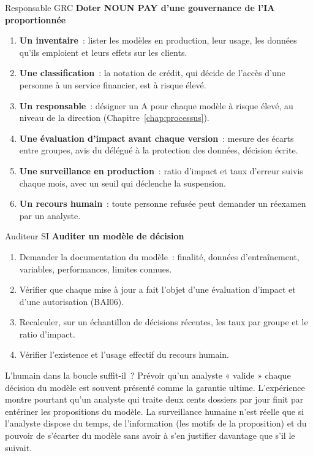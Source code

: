 \begin{boxmetier}{Responsable GRC}
\textbf{Doter NOUN PAY d'une gouvernance de l'IA proportionnée}
\begin{enumerate}
    \item \textbf{Un inventaire}~: lister les modèles en production, leur
          usage, les données qu'ils emploient et leurs effets sur les
          clients.
    \item \textbf{Une classification}~: la notation de crédit, qui décide
          de l'accès d'une personne à un service financier, est à risque
          élevé.
    \item \textbf{Un responsable}~: désigner un A pour chaque modèle à
          risque élevé, au niveau de la direction (Chapitre~\ref{chap:processus}).
    \item \textbf{Une évaluation d'impact avant chaque version}~: mesure
          des écarts entre groupes, avis du délégué à la protection des
          données, décision écrite.
    \item \textbf{Une surveillance en production}~: ratio d'impact et taux
          d'erreur suivis chaque mois, avec un seuil qui déclenche la
          suspension.
    \item \textbf{Un recours humain}~: toute personne refusée peut demander
          un réexamen par un analyste.
\end{enumerate}
\end{boxmetier}

\begin{boxmetier}{Auditeur SI}
\textbf{Auditer un modèle de décision}
\begin{enumerate}
    \item Demander la documentation du modèle~: finalité, données
          d'entraînement, variables, performances, limites connues.
    \item Vérifier que chaque mise à jour a fait l'objet d'une évaluation
          d'impact et d'une autorisation (BAI06).
    \item Recalculer, sur un échantillon de décisions récentes, les taux
          par groupe et le ratio d'impact.
    \item Vérifier l'existence et l'usage effectif du recours humain.
\end{enumerate}
\end{boxmetier}

\begin{boiteRemarque}{L'humain dans la boucle suffit-il~?}
Prévoir qu'un analyste « valide » chaque décision du modèle est souvent
présenté comme la garantie ultime. L'expérience montre pourtant qu'un
analyste qui traite deux cents dossiers par jour finit par entériner les
propositions du modèle. La surveillance humaine n'est réelle que si
l'analyste dispose du temps, de l'information (les motifs de la
proposition) et du pouvoir de s'écarter du modèle sans avoir à s'en
justifier davantage que s'il le suivait.
\end{boiteRemarque}

